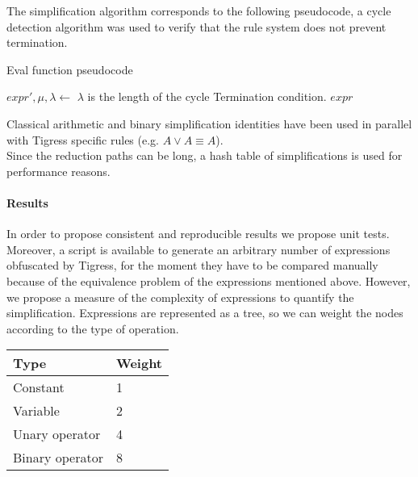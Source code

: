 \documentclass{projectreport}
\begin{document}
The simplification algorithm corresponds to the following pseudocode, a cycle detection algorithm was used to verify that the rule system does not prevent termination.

\begin{algorithm}
\caption{Eval function pseudocode}\label{alg:cap}
\begin{algorithmic}
    \State $expr', \mu, \lambda \gets$ 
    \LineComment $\lambda$ is the length of the cycle
    \Else 
    \LineComment Termination condition.
    \Return $expr$
    \Else 
    \Return {}
    \EndIf
    \EndIf
\end{algorithmic}
\end{algorithm}

Classical arithmetic and binary simplification identities have been used in parallel with Tigress specific rules (e.g. $A \lor A \equiv A$). \\
Since the reduction paths can be long, a hash table of simplifications is used for performance reasons.
\paragraph{Results}
In order to propose consistent and reproducible results we propose unit tests.  Moreover, a script is available to generate an arbitrary number of expressions obfuscated by Tigress, for the moment they have to be compared manually because of the equivalence problem of the expressions mentioned above.
However, we propose a measure of the complexity of expressions to quantify the simplification. Expressions are represented as a tree, so we can weight the nodes according to the type of operation.

\begin{table}[!ht]
\centering
\begin{tabular}{ll}
\hline
\multicolumn{1}{|l|}{Type}            & \multicolumn{1}{l|}{Weight} \\ \hline
\multicolumn{1}{|l|}{Constant}        & \multicolumn{1}{l|}{1}      \\ \hline
\multicolumn{1}{|l|}{Variable}        & \multicolumn{1}{l|}{2}      \\ \hline
\multicolumn{1}{|l|}{Unary operator}  & \multicolumn{1}{l|}{4}      \\ \hline
\multicolumn{1}{|l|}{Binary operator} & \multicolumn{1}{l|}{8}      \\ \hline
\end{tabular}
\end{table}
\end{document}
